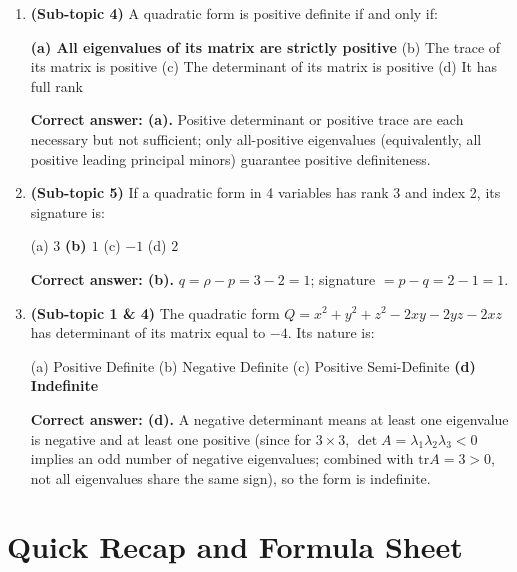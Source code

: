 \documentclass[12pt,a4paper]{article}
\begin{document}
\begin{enumerate}[leftmargin=2em, label=\textbf{MCQ\arabic*.}]
  \item \textbf{(Sub-topic 4)} A quadratic form is positive definite if and only if:

  \textbf{(a) All eigenvalues of its matrix are strictly positive}
  \quad (b) The trace of its matrix is positive
  \quad (c) The determinant of its matrix is positive
  \quad (d) It has full rank

  \textbf{Correct answer: (a).} Positive determinant or positive trace are each necessary but not sufficient; only all-positive eigenvalues (equivalently, all positive leading principal minors) guarantee positive definiteness.

  \item \textbf{(Sub-topic 5)} If a quadratic form in 4 variables has rank 3 and index 2, its signature is:

  (a) $3$ \quad \textbf{(b) $1$} \quad (c) $-1$ \quad (d) $2$

  \textbf{Correct answer: (b).} $q = \rho - p = 3-2=1$; signature $= p - q = 2-1 = 1$.

  \item \textbf{(Sub-topic 1 \& 4)} The quadratic form $Q = x^{2} + y^{2} + z^{2} - 2xy - 2yz - 2xz$ has determinant of its matrix equal to $-4$. Its nature is:

  (a) Positive Definite \quad (b) Negative Definite \quad (c) Positive Semi-Definite \quad \textbf{(d) Indefinite}

  \textbf{Correct answer: (d).} A negative determinant means at least one eigenvalue is negative and at least one positive (since for $3\times3$, $\det A = \lambda_1\lambda_2\lambda_3 < 0$ implies an odd number of negative eigenvalues; combined with $\mathrm{tr}A = 3 > 0$, not all eigenvalues share the same sign), so the form is indefinite.
\end{enumerate}

\section{Quick Recap and Formula Sheet}
\end{document}
